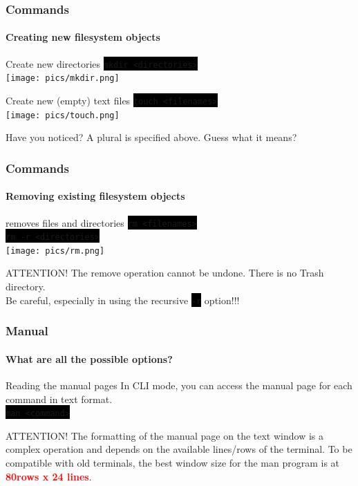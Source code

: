 \documentclass[unknownkeysallowed, 10pt, a4 paper, handout]{beamer}
\newcommand{\focus}[1]{\textbf{\textcolor{red}{#1}}}
\newcommand{\code}[1]{\colorbox{black}{\color{green}\texttt{#1}}}
\begin{document}
\begin{frame}[c]
  \frametitle{Commands}
  \framesubtitle{Creating new filesystem objects}

  \begin{exampleblock}{Create new directories}
    \code{mkdir <directories>}\\
    \texttt{[image: pics/mkdir.png]}
  \end{exampleblock}

  \begin{exampleblock}{Create new (empty) text files}
    \code{touch <filenames>}\\
    \texttt{[image: pics/touch.png]}
  \end{exampleblock}

  \begin{alertblock}{Have you noticed?}
    A plural is specified above. Guess what it means?
  \end{alertblock}
\end{frame}

\begin{frame}[c]
  \frametitle{Commands}
  \framesubtitle{Removing existing filesystem objects}

  \begin{exampleblock}{removes files and directories}
    \code{rm <filenames>}\\
    \code{rm -r <directories>} \\
    \texttt{[image: pics/rm.png]}
  \end{exampleblock}

  \begin{alertblock}{ATTENTION!}
    The remove operation cannot be undone. There is no Trash directory.\\
    Be careful, especially in using the recursive \code{-r} option!!!
  \end{alertblock}
\end{frame}


\begin{frame}[c]
  \frametitle{Manual}
  \framesubtitle{What are all the possible options?}

  \begin{exampleblock}{Reading the manual pages}
    In CLI mode, you can access the manual page for each command in text
    format. \\
    \code{man <command>}
  \end{exampleblock}

  \begin{alertblock}{ATTENTION!}
    The formatting of the manual page on the text window is a complex
    operation and depends on the available lines/rows of the terminal.
    To be compatible with old terminals, the best window size for the
    man program is at \focus{80rows x 24 lines}. 
  \end{alertblock}
\end{frame}
\end{document}
